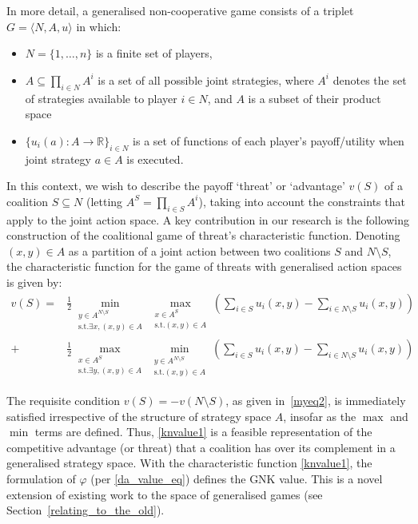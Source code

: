 In more detail, a generalised non-cooperative game consists of a triplet $G = \langle N,A,u \rangle$ in which:
\begin{itemize}
\item	$N=\{1,\dots,n\}$ is a finite set of players,
\item	$A\subseteq \prod_{i\in N}A^i$ is a set of all possible joint strategies, where $A^i$ denotes the set of strategies available to player $i\in N$, and $A$ is a subset of their product space
\item	$\{u_i(a) : A\rightarrow \mathbb{R}\}_{i\in N}$ is a set of functions of each player's payoff/utility when joint strategy $a\in A$ is executed.
\end{itemize}

In this context, we wish to describe the payoff `threat' or `advantage' $v(S)$ of a coalition $S\subseteq N$ (letting $A^S=\prod_{i\in S}A^i$), taking into account the constraints that apply to the joint action space.  
A key contribution in our research is the following construction of the coalitional game of threat's characteristic function. 
Denoting $(x,y)\in A$ as a partition of a joint action between two coalitions $S$ and $N\setminus S$, 
the characteristic function for the game of threats with generalised action spaces is given by:
\begin{align}
\label{knvalue1}
v(S) = &
\frac{1}{2}\min_{\substack{y\in A^{N\setminus S} \\ \text{s.t.}\exists x,(x,y)\in A}} 
\max_{\substack{x\in A^S \\ \text{s.t.}(x,y)\in A}}
	\left(\sum_{i\in S} u_i(x,y) - \sum_{i\in N\setminus S}u_i(x,y)\right)\nonumber\\
+&
\frac{1}{2}\max_{\substack{x\in A^S \\ \text{s.t.}\exists y,(x,y)\in A}}
\min_{\substack{y\in A^{N\setminus S} \\ \text{s.t.}(x,y)\in A}}
	\left(\sum_{i\in S} u_i(x,y) - \sum_{i\in N\setminus S} u_i(x,y) \right)
\end{align}

The requisite condition $v(S)=-v(N\setminus S)$, as given in~\eqref{myeq2}, is immediately satisfied irrespective of the structure of strategy space $A$, insofar as the $\max$ and $\min$ terms are defined.
Thus, \eqref{knvalue1} is a feasible representation of the competitive advantage (or threat) that a coalition has over its complement in a generalised strategy space.
With the characteristic function \eqref{knvalue1}, the formulation of $\varphi$ (per \eqref{da_value_eq}) defines the GNK value.
This is a novel extension of existing work to the space of generalised games (see Section~\ref{relating_to_the_old}).

